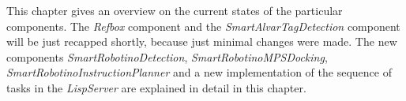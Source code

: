 This chapter gives an overview on the current states of the particular components. The \textit{Refbox} component and the \textit{SmartAlvarTagDetection} component will be just recapped shortly, because just minimal changes were made.
The new components \textit{SmartRobotinoDetection}, \textit{SmartRobotinoMPSDocking}, \textit{SmartRobotinoInstructionPlanner} and a new implementation of the sequence of tasks in the \textit{LispServer} are explained in detail in this chapter.
